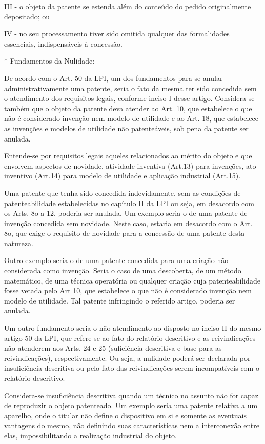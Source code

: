 \documentclass[12pt]{article}
\begin{document}
 III - o objeto da patente se estenda além do conteúdo do pedido
 originalmente depositado; ou
 
 IV - no seu processamento tiver sido omitida qualquer das
 formalidades essenciais, indispensáveis à concessão.
 
 * Fundamentos da Nulidade:
 
 De acordo com o Art. 50 da LPI, um dos fundamentos para se anular
 administrativamente uma patente, seria o fato da mesma ter sido
 concedida sem o atendimento dos requisitos legais, conforme inciso I
 desse artigo. Considera-se também que o objeto da patente deva
 atender ao Art. 10, que estabelece o que não é considerado invenção
 nem modelo de utilidade e ao Art. 18, que estabelece as invenções e
 modelos de utilidade não patenteáveis, sob pena da patente ser
 anulada.
 
 Entende-se por requisitos legais aqueles relacionados ao mérito do
 objeto e que envolvem aspectos de novidade, atividade inventiva
 (Art.13) para invenções, ato inventivo (Art.14) para modelo de
 utilidade e aplicação industrial (Art.15).
 
 Uma patente que tenha sido concedida indevidamente, sem as condições
 de patenteabilidade estabelecidas no capítulo II da LPI ou seja, em
 desacordo com os Arts. 8o a 12, poderia ser anulada.  Um exemplo
 seria o de uma patente de invenção concedida sem novidade. Neste
 caso, estaria em desacordo com o Art. 8o, que exige o requisito de
 novidade para a concessão de uma patente desta natureza.
 
 Outro exemplo seria o de uma patente concedida para uma criação não
 considerada como invenção. Seria o caso de uma descoberta, de um
 método matemático, de uma técnica operatória ou qualquer criação cuja
 patenteabilidade fosse vetada pelo Art 10, que estabelece o que não é
 considerado invenção nem modelo de utilidade. Tal patente infringindo
 o referido artigo, poderia ser anulada.
 
 Um outro fundamento seria o não atendimento ao disposto no inciso II
 do mesmo artigo 50 da LPI, que refere-se ao fato do relatório
 descritivo e as reivindicações não atenderem aos Arts. 24 e 25
 (suficiência descritiva e base para as reivindicações),
 respectivamente. Ou seja, a nulidade poderá ser declarada por
 insuficiência descritiva ou pelo fato das reivindicações serem
 incompatíveis com o relatório descritivo.
 
 Considera-se insuficiência descritiva quando um técnico no assunto
 não for capaz de reproduzir o objeto patenteado. Um exemplo seria uma
 patente relativa a um aparelho, onde o titular não define o
 dispositivo em si e somente as eventuais vantagens do mesmo, não
 definindo suas características nem a interconexão entre elas,
 impossibilitando a realização industrial do objeto.
 
\end{document}

